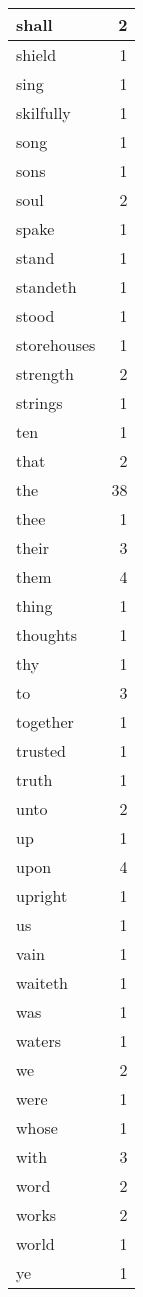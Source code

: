 \begin{center}
\begin{longtable}{l|r}
shall & 2 \\ \hline
shield & 1 \\ \hline
sing & 1 \\ \hline
skilfully & 1 \\ \hline
song & 1 \\ \hline
sons & 1 \\ \hline
soul & 2 \\ \hline
spake & 1 \\ \hline
stand & 1 \\ \hline
standeth & 1 \\ \hline
stood & 1 \\ \hline
storehouses & 1 \\ \hline
strength & 2 \\ \hline
strings & 1 \\ \hline
ten & 1 \\ \hline
that & 2 \\ \hline
the & 38 \\ \hline
thee & 1 \\ \hline
their & 3 \\ \hline
them & 4 \\ \hline
thing & 1 \\ \hline
thoughts & 1 \\ \hline
thy & 1 \\ \hline
to & 3 \\ \hline
together & 1 \\ \hline
trusted & 1 \\ \hline
truth & 1 \\ \hline
unto & 2 \\ \hline
up & 1 \\ \hline
upon & 4 \\ \hline
upright & 1 \\ \hline
us & 1 \\ \hline
vain & 1 \\ \hline
waiteth & 1 \\ \hline
was & 1 \\ \hline
waters & 1 \\ \hline
we & 2 \\ \hline
were & 1 \\ \hline
whose & 1 \\ \hline
with & 3 \\ \hline
word & 2 \\ \hline
works & 2 \\ \hline
world & 1 \\ \hline
ye & 1 \\ \hline
\end{longtable}
\end{center}




